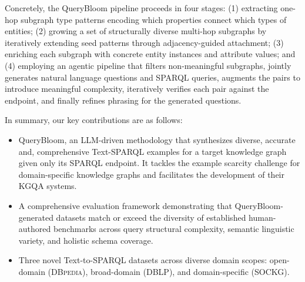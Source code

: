 Concretely, the QueryBloom pipeline proceeds in four stages: (1) extracting one-hop subgraph type patterns encoding which properties connect which types of entities; (2) growing a set of structurally diverse multi-hop subgraphs by iteratively extending seed patterns through adjacency-guided attachment; (3) enriching each subgraph with concrete entity instances and attribute values; and (4) employing an agentic pipeline that filters non-meaningful subgraphs, jointly generates natural language questions and SPARQL queries, augments the pairs to introduce meaningful complexity, iteratively verifies each pair against the endpoint, and finally refines phrasing for the generated questions.


In summary, our key contributions are as follows:
\begin{itemize}
	\item QueryBloom, an LLM-driven methodology that synthesizes diverse, accurate and, comprehensive Text-SPARQL examples for a target knowledge graph given only its SPARQL endpoint. It tackles the example scarcity challenge for domain-specific knowledge graphs and facilitates
 the development of their KGQA systems.
	\item A comprehensive evaluation framework demonstrating that QueryBloom-generated datasets match or exceed the diversity of established human-authored benchmarks across query structural complexity, semantic linguistic variety, and holistic schema coverage.
	\item Three novel Text-to-SPARQL datasets across diverse domain scopes: open-domain (\textsc{DBpedia}), broad-domain (\textsc{DBLP}), and domain-specific (\textsc{SOCKG}).
\end{itemize}